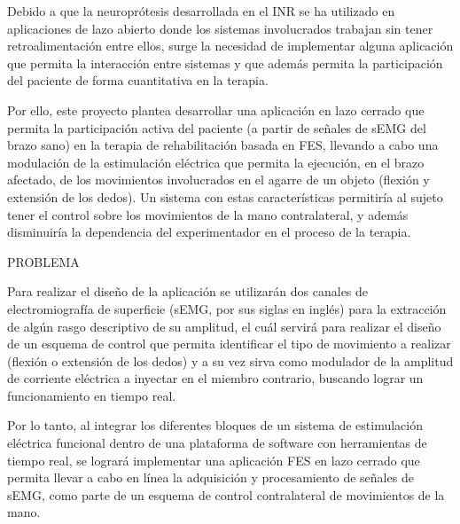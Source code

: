 
Debido a que la neuroprótesis desarrollada en el INR se ha utilizado en aplicaciones de lazo abierto donde los sistemas involucrados trabajan sin tener retroalimentación entre ellos, surge la necesidad de implementar alguna aplicación que permita la interacción entre sistemas y que además permita la participación del paciente de forma cuantitativa en la terapia.

Por ello, este proyecto plantea desarrollar una aplicación en lazo cerrado que permita la participación activa del paciente (a partir de señales de sEMG del brazo sano) en la terapia de rehabilitación basada en FES, llevando a cabo una modulación de la estimulación eléctrica que permita la ejecución, en el brazo afectado, de los movimientos involucrados en el agarre de un objeto (flexión y extensión de los dedos). Un sistema con estas características permitiría al sujeto tener el control sobre los movimientos de la mano contralateral, y además disminuiría la dependencia del experimentador en el proceso de la terapia.

{\color{red}PROBLEMA\\}

Para realizar el diseño de la aplicación se utilizarán dos canales de electromiografía de superficie (sEMG, por sus siglas en inglés) para la extracción de algún rasgo descriptivo de su amplitud, el cuál servirá para realizar el diseño de un esquema de control que permita identificar el tipo de movimiento a realizar (flexión o extensión de los dedos) y a su vez sirva como modulador de la amplitud de corriente eléctrica a inyectar en el miembro contrario, buscando lograr un funcionamiento en tiempo real.


Por lo tanto, al integrar los diferentes bloques de un sistema de estimulación eléctrica funcional dentro de una plataforma de software con herramientas de tiempo real, se logrará implementar una aplicación FES en lazo cerrado que permita llevar a cabo en línea la adquisición y procesamiento de señales de sEMG, como parte de un esquema de control contralateral de movimientos de la mano.

